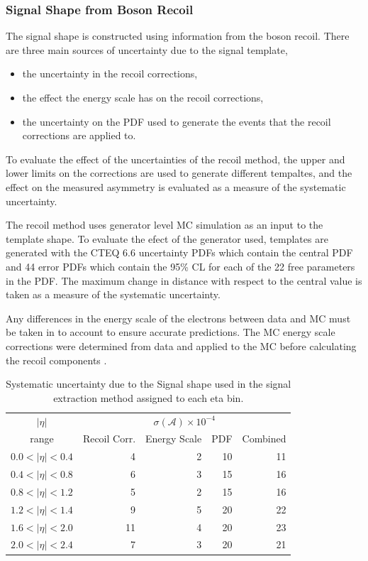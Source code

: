 \subsubsection{Signal \ETm Shape from Boson Recoil}

The signal \ETm shape is constructed using information from the boson recoil.
There are three main sources of uncertainty due to the signal template,

\begin{itemize}
    \item the uncertainty in the recoil corrections,
    \item the effect the energy scale has on the recoil corrections,
    \item the uncertainty on the \ac{PDF} used to generate the events that the
recoil corrections are applied to.
\end{itemize}

To evaluate the effect of the uncertainties of the recoil method, the upper and
lower limits on the corrections are used to generate different tempaltes, and
the effect on the measured asymmetry is evaluated as a measure of the
systematic uncertainty.

The recoil method uses generator level \ac{MC} simulation as an input to the
template shape. To evaluate the efect of the generator used, templates are
generated with the CTEQ 6.6 
uncertainty \acp{PDF} which contain the central \ac{PDF} and 44 error \acp{PDF}
which contain the \unit{95}{\%} \ac{CL} for each of the 22 free parameters in
the \ac{PDF}. The maximum change in distance with respect to the central value
is taken as a measure of the systematic uncertainty.

Any differences in the energy scale of the electrons between data and \ac{MC}
must be taken in to account to ensure accurate \ETm predictions. The \ac{MC} energy
scale corrections were determined from \PZ data and applied to the \PZ \ac{MC}
before calculating the recoil components \cite{recoil}.

\begin{table}[htbp]
\begin{center}
\begin{tabular}{crrrr}
    \toprule
$|\eta|$   & \multicolumn{4}{c}{$\sigma(\mathcal{A}) \times 10^{-4}$}\\
range      & Recoil Corr. & Energy Scale & PDF & Combined \\
\midrule
$0.0<|\eta|<0.4$ &  4 & 2 & 10  & 11 \\
$0.4<|\eta|<0.8$ &  6 & 3 & 15  & 16 \\
$0.8<|\eta|<1.2$ &  5 & 2 & 15  & 16 \\
$1.2<|\eta|<1.4$ &  9 & 5 & 20  & 22 \\
$1.6<|\eta|<2.0$ & 11 & 4 & 20  & 23 \\
$2.0<|\eta|<2.4$ &  7 & 3 & 20  & 21 \\
    \bottomrule
\end{tabular}
\caption{\label{tab:systSIG}Systematic uncertainty due to the Signal \ETm shape used in the signal
extraction method assigned to each eta bin.}
\end{center}
\end{table}

